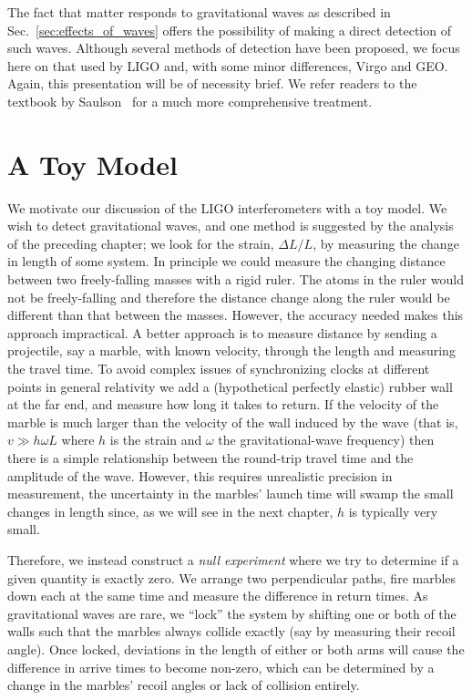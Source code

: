 The fact that matter responds to gravitational waves as described in
Sec.~\ref{sec:effects_of_waves} offers the possibility of making a
direct detection of such waves.  Although several methods of detection
have been proposed, we focus here on that used by LIGO and, with some
minor differences, Virgo and GEO.  Again, this presentation will be of
necessity brief.  We refer readers to the textbook by
Saulson~\cite{Saulson:1994} for a much more comprehensive treatment.

\section{A Toy Model}

We motivate our discussion of the LIGO interferometers with a toy
model.  We wish to detect gravitational waves, and one method is
suggested by the analysis of the preceding chapter; we look for the
strain, $\Delta L/L$, by measuring the change in length of some system.
In principle we could measure the changing distance between two
freely-falling masses with a rigid ruler.  The atoms in the ruler
would not be freely-falling and therefore the distance change along
the ruler would be different than that between the masses.  However,
the accuracy needed makes this approach impractical.  A better
approach is to measure distance by sending a projectile, say a marble,
with known velocity, through the length and measuring the travel time.
To avoid complex issues of synchronizing clocks at different points in
general relativity we add a (hypothetical perfectly elastic) rubber
wall at the far end, and measure how long it takes to return.  If the
velocity of the marble is much larger than the velocity of the wall
induced by the wave (that is, $v \gg h \omega L$ where $h$ is the
strain and $\omega$ the gravitational-wave frequency) then there is a
simple relationship between the round-trip travel time and the
amplitude of the wave.  However, this requires unrealistic precision
in measurement, the uncertainty in the marbles' launch time will swamp
the small changes in length since, as we will see in the next chapter,
$h$ is typically very small.

Therefore, we instead construct a \emph{null experiment} where we try
to determine if a given quantity is exactly zero.  We arrange two
perpendicular paths, fire marbles down each at the same time and
measure the difference in return times.  As gravitational waves are
rare, we ``lock'' the system by shifting one or both of the walls such
that the marbles always collide exactly (say by measuring their recoil
angle).  Once locked, deviations in the length of either or both arms
will cause the difference in arrive times to become non-zero, which
can be determined by a change in the marbles' recoil angles or lack of
collision entirely.

